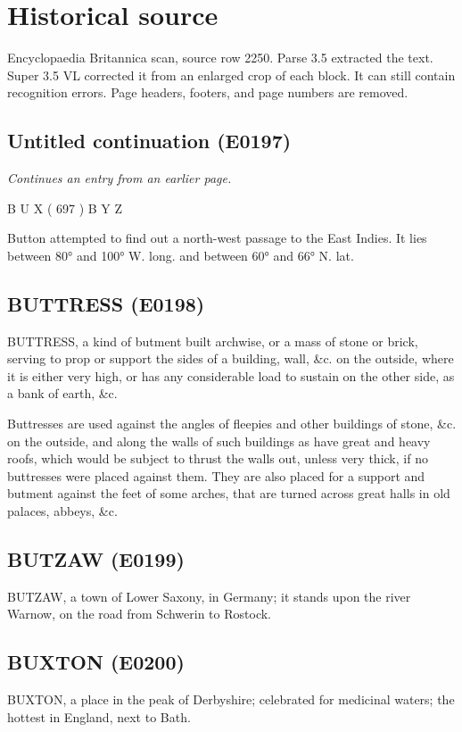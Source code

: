 \documentclass{article}
\begin{document}
\section*{Historical source}
Encyclopaedia Britannica scan, source row 2250. Parse 3.5 extracted the text. Super 3.5 VL corrected it from an enlarged crop of each block. It can still contain recognition errors.
Page headers, footers, and page numbers are removed.

\subsection*{Untitled continuation (E0197)}
\textit{Continues an entry from an earlier page.}

B U X ( 697 ) B Y Z

Button attempted to find out a north-west passage to the East Indies. It lies between 80° and 100° W. long. and between 60° and 66° N. lat.

\subsection*{BUTTRESS (E0198)}
BUTTRESS, a kind of butment built archwise, or a mass of stone or brick, serving to prop or support the sides of a building, wall, \&c. on the outside, where it is either very high, or has any considerable load to sustain on the other side, as a bank of earth, \&c.

Buttresses are used against the angles of fleepies and other buildings of stone, \&c. on the outside, and along the walls of such buildings as have great and heavy roofs, which would be subject to thrust the walls out, unless very thick, if no buttresses were placed against them. They are also placed for a support and butment against the feet of some arches, that are turned across great halls in old palaces, abbeys, \&c.

\subsection*{BUTZAW (E0199)}
BUTZAW, a town of Lower Saxony, in Germany; it stands upon the river Warnow, on the road from Schwerin to Rostock.

\subsection*{BUXTON (E0200)}
BUXTON, a place in the peak of Derbyshire; celebrated for medicinal waters; the hottest in England, next to Bath.
\end{document}
